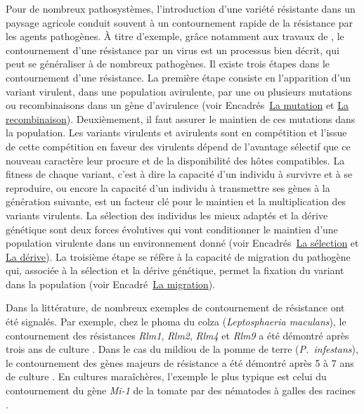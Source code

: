 	Pour de nombreux pathosystèmes, l’introduction d’une variété résistante dans un paysage
agricole  conduit souvent à  un  contournement rapide de la résistance par les agents pathogènes. À titre d’exemple, grâce notamment aux travaux de \citet{Moury2010}, le contournement d’une résistance par un virus est un processus bien décrit, qui peut se généraliser à de nombreux pathogènes. Il existe trois étapes
dans le contournement d’une résistance.  La première étape consiste en l’apparition d’un
variant virulent, dans une population avirulente, par une ou plusieurs mutations ou recombinaisons dans un gène d’avirulence (voir Encadrés~\hypertarget{mut2}{\hyperlink{mut1}{La mutation}} et \hypertarget{recomb2}{\hyperlink{recomb1}{La recombinaison}}). 
 Deuxièmement, il faut assurer le maintien de ces mutations
dans la population. Les variants virulents et avirulents sont en compétition et l'issue de cette compétition en faveur des virulents dépend de l’avantage sélectif que ce nouveau caractère leur
procure et de la disponibilité des hôtes compatibles. La fitness de chaque variant, c’est à dire la capacité d’un individu à survivre et à se reproduire, ou encore la capacité d’un individu à transmettre ses gènes à la génération suivante, est un facteur clé pour le maintien et la multiplication des variants virulents. La sélection
des individus les mieux adaptés et la dérive génétique sont deux forces évolutives qui vont
conditionner le maintien d’une population virulente dans un environnement donné \citep{McDonald2002a} (voir Encadrés~\hypertarget{selec2}{\hyperlink{selec1}{La sélection}} et \hypertarget{der2}{\hyperlink{der1}{La dérive}}). La troisième étape se réfère à la capacité de migration du pathogène qui, associée à la sélection et la dérive génétique, permet la fixation du variant dans la population \citep{Brown2002, Charlesworth2009} (voir Encadré~\hypertarget{mig2}{\hyperlink{mig1}{La migration}}).

	Dans la littérature, de nombreux exemples de contournement de résistance ont été signalés.
Par exemple, chez  le phoma du colza (\textit{Leptosphaeria maculans}),  le contournement des résistances \textit{Rlm1}, \textit{Rlm2}, \textit{Rlm4} et \textit{Rlm9} a été démontré après trois ans de culture \citep{Rouxel2005, Rouxel2003}.
Dans le cas du mildiou de la pomme de terre (\textit{P.~infestans}), le contournement des  gènes majeurs de résistance  a été démontré après 5 à 7 ans de culture  \citep{Pilet2005, Kuang2005, Montarry2006}. 
En cultures maraîchères, l’exemple le plus typique est celui du contournement du gène \textit{Mi-1} de la tomate par des nématodes à galles des racines \citep{Castagnone-Sereno2002}. 


